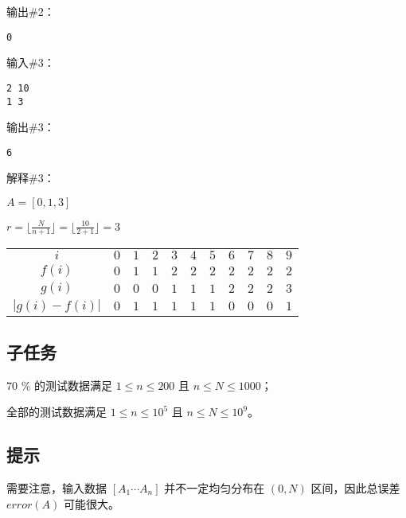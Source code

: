 输出\#2：

\begin{lstlisting}
0
\end{lstlisting}

输入\#3：

\begin{lstlisting}
2 10
1 3
\end{lstlisting}

输出\#3：

\begin{lstlisting}
6
\end{lstlisting}

解释\#3：

$A=[0, 1, 3]$

$r = \lfloor \frac{N}{n+1}\rfloor=\lfloor \frac{10}{2+1}\rfloor=3$

\begin{table}[H]
  \centering
  \begin{tabular}{ccccccccccc}
    \toprule
    $i$ & $0$ & $1$ & $2$ & $3$ & $4$ & $5$ & $6$ & $7$ & $8$ & $9$ \\
    $f(i)$ & $0$ & $1$ & $1$ & $2$ & $2$ & $2$ & $2$ & $2$ & $2$ & $2$ \\
    $g(i)$ & $0$ & $0$ & $0$ & $1$ & $1$ & $1$ & $2$ & $2$ & $2$ & $3$ \\
    $|g(i)-f(i)|$ & $0$ & $1$ & $1$ & $1$ & $1$ & $1$ & $0$ & $0$ & $0$ & $1$ \\
    \bottomrule
  \end{tabular}
\end{table}

\subsection*{子任务}

$70$ \% 的测试数据满足 $1\le n\le 200$ 且 $n\le N\le 1000$；

全部的测试数据满足 $1\le n\le 10^5$ 且 $n\le N\le 10^9$。

\subsection*{提示}

需要注意，输入数据 $[A_1\cdots A_n]$
 并不一定均匀分布在 $(0,N)$ 区间，因此总误差 $error(A)$ 可能很大。